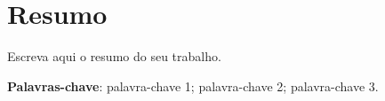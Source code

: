 
\chapter*{Resumo}

	\noindent Escreva aqui o resumo do seu trabalho.

	\vspace{5mm}
	
	\noindent\textbf{Palavras-chave}: palavra-chave 1; palavra-chave 2; palavra-chave 3.
	
	\thispagestyle{empty}